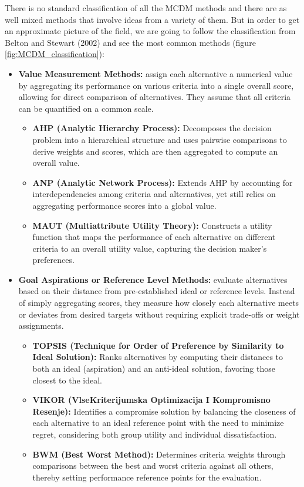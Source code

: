 There is no standard classification of all the MCDM methods and there are as well mixed methods that involve ideas from a variety of them. But in order to get an approximate picture of the field, we are going to follow the classification from Belton and Stewart (2002) and see the most common methods (figure \ref{fig:MCDM_classification}):

\begin{itemize}
    \item \textbf{Value Measurement Methods:} assign each alternative a numerical value by aggregating its performance on various criteria into a single overall score, allowing for direct comparison of alternatives. They assume that all criteria can be quantified on a common scale.
    \begin{itemize}
        \item \textbf{AHP (Analytic Hierarchy Process):} Decomposes the decision problem into a hierarchical structure and uses pairwise comparisons to derive weights and scores, which are then aggregated to compute an overall value.
        \item \textbf{ANP (Analytic Network Process):} Extends AHP by accounting for interdependencies among criteria and alternatives, yet still relies on aggregating performance scores into a global value.
        \item \textbf{MAUT (Multiattribute Utility Theory):} Constructs a utility function that maps the performance of each alternative on different criteria to an overall utility value, capturing the decision maker's preferences.
    \end{itemize}
    
    \item \textbf{Goal Aspirations or Reference Level Methods:} evaluate alternatives based on their distance from pre-established ideal or reference levels. Instead of simply aggregating scores, they measure how closely each alternative meets or deviates from desired targets without requiring explicit trade-offs or weight assignments.
    \begin{itemize}
        \item \textbf{TOPSIS (Technique for Order of Preference by Similarity to Ideal Solution):} Ranks alternatives by computing their distances to both an ideal (aspiration) and an anti-ideal solution, favoring those closest to the ideal.
        \item \textbf{VIKOR (VlseKriterijumska Optimizacija I Kompromisno Resenje):}         Identifies a compromise solution by balancing the closeness of each alternative to an ideal reference point with the need to minimize regret, considering both group utility and individual dissatisfaction.
        \item \textbf{BWM (Best Worst Method):} Determines criteria weights through comparisons between the best and worst criteria against all others, thereby setting performance reference points for the evaluation.
    \end{itemize}
    

\end{itemize}
